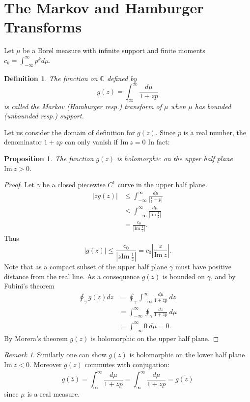 \documentclass{amsart}
\newtheorem{proposition}[theorem]{Proposition}
\newtheorem{definition}[theorem]{Definition}
\theoremstyle{remark}
\newtheorem{remark}[theorem]{Remark}
\numberwithin{equation}{section}
\newcommand{\CC}{\mathbb{C}}
\newcommand{\im}{\text{Im}~}
\begin{document}
\section{The Markov and Hamburger Transforms}
Let $\mu$ be a Borel measure with infinite support and finite moments $c_k = \int_{-\infty}^\infty p^k d\mu$. 

\begin{definition}
The function on $\CC$ defined by
\[
    g(z) = \int_\infty^\infty\frac{d\mu}{1+zp}
\]
is called the Markov (Hamburger resp.) transform of $\mu$ when $\mu$ has bounded (unbounded resp.) support.
\end{definition}

Let us consider the domain of definition for $g(z)$. Since $p$ is a real number, the denominator $1 + zp$ can only vanish if $\im z = 0$ In fact:
\begin{proposition}
The function $g(z)$ is holomorphic on the upper half plane $\im z > 0$.
\end{proposition}
\begin{proof}
Let $\gamma$ be a closed piecewise $C^1$ curve in the upper half plane. 
\begin{align*}
    |zg(z)| 
    &\leq \int_{-\infty}^\infty \frac{d\mu}{|\frac1z + p|} \\
    &\leq \int_{-\infty}^\infty \frac{d\mu}{|\im \frac1z|} \\
    &= \frac{c_0}{|\im \frac1z|}.
\end{align*}
Thus
\[
    |g(z)| \leq \frac{c_0}{|z \im \frac1z|} = c_0\left|\frac{z}{\im z}\right|.
\]
Note that as a compact subset of the upper half plane $\gamma$ must have positive distance from the real line. As a consequence $g(z)$ is bounded on $\gamma$, and by Fubini's theorem
\begin{align*}
    \oint_\gamma g(z) dz
    &= \oint_\gamma \int_{-\infty}^\infty \frac{d\mu}{1 + zp} ~dz \\
    &= \int_{-\infty}^\infty \oint_\gamma \frac{dz}{1 + zp} ~d\mu \\
    &= \int_{-\infty}^\infty 0 ~d\mu = 0.
\end{align*}
By Morera's theorem $g(z)$ is holomorphic on the upper half plane.
\end{proof}

\begin{remark}
Similarly one can show $g(z)$ is holomorphic on the lower half plane $\im z < 0$. Moreover $g(z)$ commutes with conjugation:
\[
    g(\bar z) = \int_\infty^\infty\frac{d\mu}{1+\bar zp} = \overline{\int_\infty^\infty\frac{d\mu}{1+zp}} = \overline{g(z)}
\]
since $\mu$ is a real measure.
\end{remark}
\end{document}
